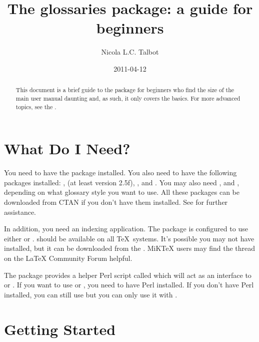 \documentclass{nlctdoc}
\title{The glossaries package: a guide for beginners}
\author{Nicola L.C. Talbot}
\date{2011-04-12}
\begin{document}
\maketitle

\begin{abstract}
This document is a brief guide to the  package for
beginners who find the size of the main user manual daunting and, as
such, it only covers the basics. For more advanced topics, see the
.
\end{abstract}

\tableofcontents

\section{What Do I Need?}
\label{requirements}

You need to have the  package installed. You also
need to have the following packages installed: ,
 (at least version 2.5f), ,  and
.
You may also need ,  and
, depending on what glossary style you want to use. All
these packages can be downloaded from CTAN if you don't have them
installed. See
 for further assistance.

In addition, you need an indexing application. The 
package is configured to use either  or .
 should be available on all \TeX\ systems. It's
possible you may not have  installed, but it can be
downloaded from the . MiKTeX users may find the
 thread on the LaTeX Community Forum helpful.

The  package provides a helper Perl script
called  which will act as an interface to
 or . If you want to use
 or , you need to have Perl
installed. If you don't have Perl installed, you can still use
 but you can only use it with .

\section{Getting Started}
\label{start}
\end{document}

